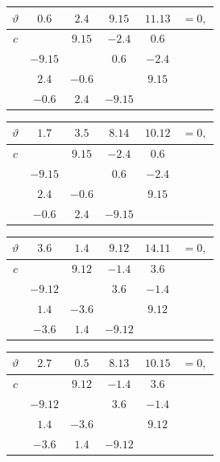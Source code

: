 \documentclass[11pt]{article}
\begin{document}
{\smallskip
\begin{center}
\begin{tabular}{c|cccc|c}\hline
$\vartheta$ & $0.6$ & $2.4$ & $9.15$ & $11.13$ & $=0,$\\\hline
$c$ & & $9.15$ & $-2.4$ & $0.6$ & \\
& $-9.15$ & & $0.6$ & $-2.4$ & \\
& $2.4$ & $-0.6$ & & $9.15$ & \\
& $-0.6$ & $2.4$ & $-9.15$ & & \\\hline
\end{tabular}
\hspace{0.8em}
\begin{tabular}{c|cccc|c}\hline
$\vartheta$ & $1.7$ & $3.5$ & $8.14$ & $10.12$ & $=0,$\\\hline
$c$ & & $9.15$ & $-2.4$ & $0.6$ & \\
& $-9.15$ & & $0.6$ & $-2.4$ & \\
& $2.4$ & $-0.6$ & & $9.15$ & \\
& $-0.6$ & $2.4$ & $-9.15$ & & \\\hline
\end{tabular}
\end{center}

\smallskip
\begin{center}
\begin{tabular}{c|cccc|c}\hline
$\vartheta$ & $3.6$ & $1.4$ & $9.12$ & $14.11$ & $=0,$\\\hline
$c$ & & $9.12$ & $-1.4$ & $3.6$ & \\
& $-9.12$ & & $3.6$ & $-1.4$ & \\
& $1.4$ & $-3.6$ & & $9.12$ & \\
& $-3.6$ & $1.4$ & $-9.12$ & & \\\hline
\end{tabular}
\hspace{0.8em}
\begin{tabular}{c|cccc|c}\hline
$\vartheta$ & $2.7$ & $0.5$ & $8.13$ & $10.15$ & $=0,$\\\hline
$c$ & & $9.12$ & $-1.4$ & $3.6$ & \\
& $-9.12$ & & $3.6$ & $-1.4$ & \\
& $1.4$ & $-3.6$ & & $9.12$ & \\
& $-3.6$ & $1.4$ & $-9.12$ & & \\\hline
\end{tabular}
\end{center}

}
\end{document}
